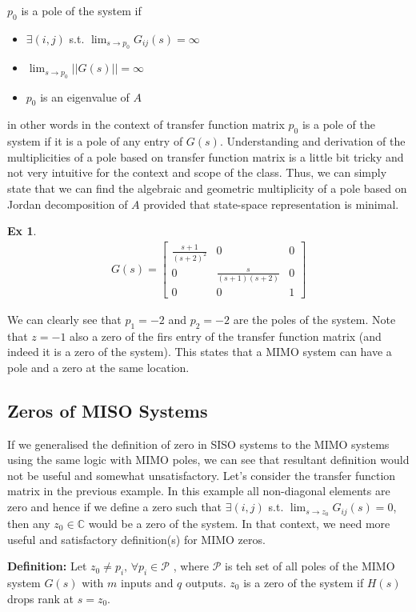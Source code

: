 \documentclass[twoside]{article}
\newtheorem{exmp}[theorem]{Ex}
\begin{document}
$p_0$ is a pole of the system if 
%
\begin{itemize}
 \item $\exists (i,j)$ s.t. $\lim_{s \to p_0}G_{ij}(s) = \infty$
 \item $\lim_{s \to p_0} || G(s) || = \infty$
 \item $p_0$ is an eigenvalue of $A$
\end{itemize}
%
in other words in the context of transfer function matrix $p_0$ is a pole of the system if it is a pole of any entry of
$G(s)$. Understanding and derivation of the multiplicities of a pole based on transfer function matrix is a little bit tricky 
and not very intuitive for the context and scope of the class. Thus, we can simply state that we can find the algebraic and
geometric multiplicity of a pole based on Jordan decomposition of $A$ provided that state-space representation is minimal. 
%
\begin{exmp}
	\begin{align*}
	G(s) = \left[ \begin{array}{ccc} \frac{s+1}{(s+2)^2} & 0 & 0 \\  
	0 & \frac{s}{(s+1)(s+2)} & 0 \\ 0 & 0 & 1  \end{array} \right]
	\end{align*}
\end{exmp}
%
We can clearly see that $p_1 = -2$ and $p_2 = -2$ are the poles of the system. Note that $z = -1$ also a zero of the 
firs entry of the transfer function matrix (and indeed it is a zero of the system). This states that a MIMO system can have 
a pole and a zero at the same location. 

\subsection{Zeros of MISO Systems}

If we generalised the definition of zero in SISO systems to the MIMO systems using the same logic with MIMO poles, we can see that
resultant definition would not be useful and somewhat unsatisfactory. Let's consider the transfer function matrix in the previous example. 
In this example all non-diagonal elements are zero and hence if we define a zero such that $\exists (i,j)$ s.t. $\lim_{s \to z_0}G_{ij}(s) = 0$,
then any $z_0 \in \mathbb{C}$ would be a zero of the system. In that context, we need more useful and satisfactory definition(s) for MIMO zeros.

\textbf{Definition:} Let $z_0 \neq p_i , \, \forall p_i \in \mathcal{P}$ , where $\mathcal{P}$ is teh set of all poles of the MIMO system $G(s)$ with $m$ inputs and
$q$ outputs. $z_0$ is a zero of the system if $H(s)$ drops rank at $s = z_0$.
\end{document}
